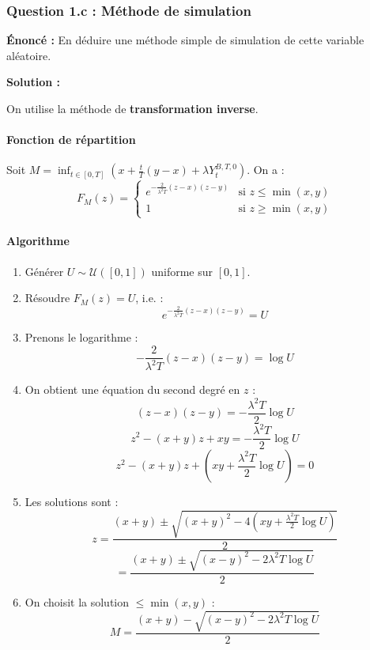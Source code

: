 \documentclass[12pt,a4paper]{article}
\theoremstyle{definition}
\theoremstyle{remark}
\begin{document}
\subsubsection{Question 1.c : Méthode de simulation}

\textbf{Énoncé :} En déduire une méthode simple de simulation de cette variable aléatoire.

\textbf{Solution :}

On utilise la méthode de \textbf{transformation inverse}.

\paragraph{Fonction de répartition}

Soit $M = \inf_{t \in [0,T]} \left(x + \frac{t}{T}(y-x) + \lambda Y_t^{B,T,0}\right)$. On a :
\[
F_M(z) = \begin{cases}
e^{-\frac{2}{\lambda^2 T}(z-x)(z-y)} & \text{si } z \leq \min(x,y) \\
1 & \text{si } z \geq \min(x,y)
\end{cases}
\]

\paragraph{Algorithme}

\begin{enumerate}
\item Générer $U \sim \mathcal{U}([0,1])$ uniforme sur $[0,1]$.

\item Résoudre $F_M(z) = U$, i.e. :
\[
e^{-\frac{2}{\lambda^2 T}(z-x)(z-y)} = U
\]

\item Prenons le logarithme :
\[
-\frac{2}{\lambda^2 T}(z-x)(z-y) = \log U
\]

\item On obtient une équation du second degré en $z$ :
\[
(z-x)(z-y) = -\frac{\lambda^2 T}{2}\log U
\]
\[
z^2 - (x+y)z + xy = -\frac{\lambda^2 T}{2}\log U
\]
\[
z^2 - (x+y)z + \left(xy + \frac{\lambda^2 T}{2}\log U\right) = 0
\]

\item Les solutions sont :
\[
z = \frac{(x+y) \pm \sqrt{(x+y)^2 - 4\left(xy + \frac{\lambda^2 T}{2}\log U\right)}}{2}
\]
\[
= \frac{(x+y) \pm \sqrt{(x-y)^2 - 2\lambda^2 T\log U}}{2}
\]

\item On choisit la solution $\leq \min(x,y)$ :
\[
\boxed{M = \frac{(x+y) - \sqrt{(x-y)^2 - 2\lambda^2 T\log U}}{2}}
\]
\end{enumerate}
\end{document}
